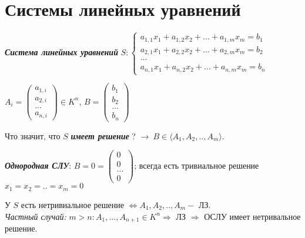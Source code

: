 \section{Системы линейных уравнений}

\begin{definition}
    \textbf{\textit{Система линейных уравнений}} 
$S:\begin{cases}a_{1,1}x_1+a_{1,2}x_2+...+a_{1,m}x_m=b_1\\ 
a_{2,1}x_1+a_{2,2}x_2+...+a_{2,m}x_m=b_2 \\ ... \\ 
a_{n,1}x_1+a_{n,2}x_2+...+a_{n,m}x_m=b_n \end{cases}$
\end{definition} 

\begin{designation}
    $A_i=\begin{pmatrix} a_{1,i} \\ a_{2,i} \\ ... \\a_{n,i} 
\end{pmatrix}\in K^n$, $B=\begin{pmatrix} b_{1} \\ b_{2} \\ ... \\b_{n} 
\end{pmatrix}$   
\end{designation}
 
\begin{definition}
    Что значит, что $S$ \textbf{\textit{имеет решение}} ? $\rightarrow\ 
B\in \langle A_1,A_2,..,A_m\rangle$.  
\end{definition}

\begin{definition}
    \textbf{\textit{Однородная СЛУ}}: $B=0=\begin{pmatrix} 0 \\ 0 \\ ... 
\\0 \end{pmatrix}$; всегда есть тривиальное решение $x_1=x_2=..=x_m=0$     
\end{definition}

\begin{definition}
    У $S$ есть нетривиальное решение $\Leftrightarrow A_1,A_2,..,A_m-$ ЛЗ. 
\\
    \textit{Частный случай:} $m>n:A_1,...,A_{n+1}\in K^n\Rightarrow$  ЛЗ 
$\Rightarrow$  ОСЛУ имеет нетривальное решение.
\end{definition}

